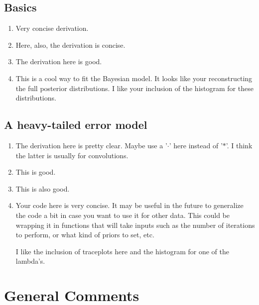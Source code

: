 \documentclass[10pt]{article}
\begin{document}
    \subsection*{Basics}

    \begin{enumerate}[label=(\Alph*)]

      \item Very concise derivation. 

      \item Here, also, the derivation is concise.

      \item The derivation here is good.

      \item This is a cool way to fit the Bayesian model. It looks like your reconstructing the full posterior distributions. I like your inclusion of the histogram for these distributions. 

    \end{enumerate}

    \subsection*{A heavy-tailed error model}

    \begin{enumerate}[label=(\Alph*)]

      \item The derivation here is pretty clear. Maybe use a '$\cdot$' here instead of '$*$'. I think the latter is usually for convolutions. 

      \item This is good.

      \item This is also good.

      \item Your code here is very concise. It may be useful in the future to generalize the code a bit in case you want to use it for other data. This could be wrapping it in functions that will take inputs such as the number of iterations to perform, or what kind of priors to set, etc. 

      I like the inclusion of traceplots here and the histogram for one of the lambda's. 

    \end{enumerate}

  \section*{General Comments}
\end{document}
